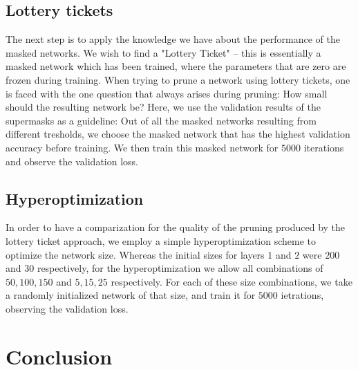 \documentclass[12pt,final,twoside]{article}
\theoremstyle{plain}
\theoremstyle{definition}
\theoremstyle{remark}
\theoremstyle{named}
\begin{document}

\subsection{Lottery tickets}

The next step is to apply the knowledge we have about the performance of the masked networks. We wish to find a "Lottery Ticket" -- this is essentially a masked network which has been trained, where the parameters that are zero are frozen during training. When trying to prune a network using lottery tickets, one is faced with the one question that always arises during pruning: How small should the resulting network be? Here, we use the validation results of the supermasks as a guideline: Out of all the masked networks resulting from different tresholds, we choose the masked network that has the highest validation accuracy before training. We then train this masked network for $5000$ iterations and observe the validation loss.

\subsection{Hyperoptimization}

In order to have a comparization for the quality of the pruning produced by the lottery ticket approach, we employ a simple hyperoptimization scheme to optimize the network size. Whereas the initial sizes for layers $1$ and $2$ were $200$ and $30$ respectively, for the hyperoptimization we allow all combinations of $50, 100, 150$ and $5, 15, 25$ respectively. For each of these size combinations, we take a randomly initialized network of that size, and train it for $5000$ ietrations, observing the validation loss.

\section{Conclusion}

    \printbibliography
\end{document}
